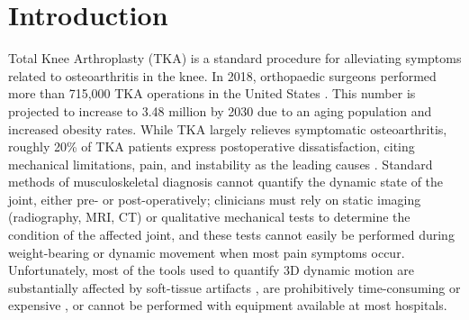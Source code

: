 \chapter{Introduction}
Total Knee Arthroplasty (TKA) is a standard procedure for alleviating symptoms related to osteoarthritis in the knee. In 2018, orthopaedic surgeons performed more than 715,000 TKA operations in the United States \cite{agencyforhealthcareresearchandqualityHCUPFastStats}. This number is projected to increase to 3.48 million by 2030 \cite{kurtzProjectionsPrimaryRevision2007} due to an aging population and increased obesity rates. While TKA largely relieves symptomatic osteoarthritis, roughly 20\% of TKA patients express postoperative dissatisfaction, citing mechanical limitations, pain, and instability as the leading causes \cite{bakerRolePainFunction2007,bournePatientSatisfactionTotal2010,scottPredictingDissatisfactionFollowing2010}. Standard methods of musculoskeletal diagnosis cannot quantify the dynamic state of the joint, either pre- or post-operatively; clinicians must rely on static imaging (radiography, MRI, CT) or qualitative mechanical tests to determine the condition of the affected joint, and these tests cannot easily be performed during weight-bearing or dynamic movement when most pain symptoms occur. Unfortunately, most of the tools used to quantify 3D dynamic motion are substantially affected by soft-tissue artifacts \cite{gaoInvestigationSoftTissue2008,stagniQuantificationSoftTissue2005,linEffectsSoftTissue2016}, are prohibitively time-consuming or expensive \cite{daemsValidationThreedimensionalTotal2016}, or cannot be performed with equipment available at most hospitals.

